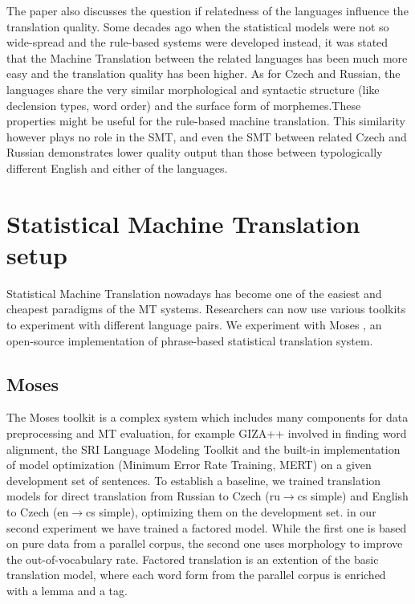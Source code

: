 \documentclass[11pt,letterpaper]{article}
\begin{document}
The paper also discusses the question if relatedness of the languages influence
the translation quality. Some decades ago when the statistical models were not so 
wide-spread and the rule-based systems were developed instead, it was stated that the 
Machine Translation between the related languages has been much more easy and the
translation quality has been higher. %
As for Czech and Russian, the languages share the very similar morphological and syntactic
structure (like declension types, word order) and the surface form of morphemes.These properties 
might be useful for the rule-based machine translation. This similarity
however plays no role in the SMT, and even %
the SMT between related Czech and Russian demonstrates lower quality output than 
those between typologically different English and either of the languages.

\section{Statistical Machine Translation setup}
Statistical Machine Translation nowadays has become one
of the easiest and cheapest paradigms of the MT systems. Researchers can now use
various toolkits to experiment with different language pairs. We experiment
with Moses , an open-source implementation of phrase-based statistical translation system.

\subsection{Moses}
The Moses toolkit \cite{moses} is a complex system which includes many components
for data preprocessing and MT evaluation, for example
GIZA++ %
involved in finding word alignment, the SRI Language Modeling
Toolkit %
and the built-in implementation of model optimization (Minimum Error Rate Training, MERT) on a
given development set of sentences.
To establish a baseline, we trained translation models for direct translation
from Russian to Czech
(ru$\rightarrow$cs simple) and English to Czech (en$\rightarrow$cs simple), %
optimizing them on the development set.
in our second experiment we have trained a factored model.
While the first one is based on pure data from a parallel corpus, the second one
uses morphology to improve the out-of-vocabulary rate.
Factored translation is an extention of the basic translation model,
where each word form from the parallel corpus is enriched with a lemma and a tag.
\end{document}
